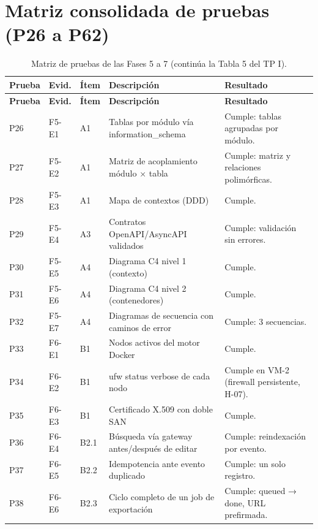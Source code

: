\documentclass[11pt,a4paper]{article}
\begin{document}
\section{Matriz consolidada de pruebas (P26 a P62)}
\begin{longtable}{|p{0.9cm}|p{1.3cm}|p{0.9cm}|p{5.6cm}|p{5.6cm}|}
\caption{Matriz de pruebas de las Fases 5 a 7 (continúa la Tabla 5 del TP I).}\\
\hline \textbf{Prueba} & \textbf{Evid.} & \textbf{Ítem} & \textbf{Descripción} & \textbf{Resultado} \\ \hline \endfirsthead
\hline \textbf{Prueba} & \textbf{Evid.} & \textbf{Ítem} & \textbf{Descripción} & \textbf{Resultado} \\ \hline \endhead
P26 & F5-E1 & A1 & Tablas por módulo vía information\_schema & Cumple: tablas agrupadas por módulo. \\ \hline
P27 & F5-E2 & A1 & Matriz de acoplamiento módulo × tabla & Cumple: matriz y relaciones polimórficas. \\ \hline
P28 & F5-E3 & A1 & Mapa de contextos (DDD) & Cumple. \\ \hline
P29 & F5-E4 & A3 & Contratos OpenAPI/AsyncAPI validados & Cumple: validación sin errores. \\ \hline
P30 & F5-E5 & A4 & Diagrama C4 nivel 1 (contexto) & Cumple. \\ \hline
P31 & F5-E6 & A4 & Diagrama C4 nivel 2 (contenedores) & Cumple. \\ \hline
P32 & F5-E7 & A4 & Diagramas de secuencia con caminos de error & Cumple: 3 secuencias. \\ \hline
P33 & F6-E1 & B1 & Nodos activos del motor Docker & Cumple. \\ \hline
P34 & F6-E2 & B1 & ufw status verbose de cada nodo & Cumple en VM-2 (firewall persistente, H-07). \\ \hline
P35 & F6-E3 & B1 & Certificado X.509 con doble SAN & Cumple. \\ \hline
P36 & F6-E4 & B2.1 & Búsqueda vía gateway antes/después de editar & Cumple: reindexación por evento. \\ \hline
P37 & F6-E5 & B2.2 & Idempotencia ante evento duplicado & Cumple: un solo registro. \\ \hline
P38 & F6-E6 & B2.3 & Ciclo completo de un job de exportación & Cumple: queued → done, URL prefirmada. \\ \hline

\end{longtable}
\end{document}
